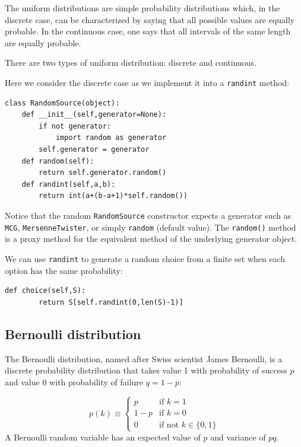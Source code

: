 \documentclass[justified,sixbynine]{tufte-book}
\def\ft{\small\tt}
\theoremstyle{plain}%
\theoremstyle{definition}
\theoremstyle{remark}
\begin{document}
\begin{fullwidth}
The uniform distributions are simple probability distributions which, in the
discrete case, can be characterized by saying that all possible values are
equally probable. In the continuous case, one says that all intervals of the
same length are equally probable.

There are two types of uniform distribution: discrete and continuous.

Here we consider the discrete case as we implement it into a {\ft randint} method:


\begin{lstlisting}[caption={in file: {\ft nlib.py}}]
class RandomSource(object):
    def __init__(self,generator=None):
        if not generator:
            import random as generator
        self.generator = generator
    def random(self):
        return self.generator.random()
    def randint(self,a,b):
        return int(a+(b-a+1)*self.random())
\end{lstlisting}

Notice that the random {\ft RandomSource} constructor expects a generator such as {\ft MCG}, {\ft MersenneTwister}, or simply {\ft random} (default value). The {\ft random()} method is a proxy method for the equivalent method of the underlying generator object.

We can use {\ft randint} to generate a random choice from a finite set when each option has the same probability:

\begin{lstlisting}[caption={in file: {\ft nlib.py}}]
    def choice(self,S):
        return S[self.randint(0,len(S)-1)]
\end{lstlisting}

\goodbreak\subsection{Bernoulli distribution}

The Bernoulli distribution, named after Swiss scientist James Bernoulli, is
a discrete probability distribution that takes value 1 with
probability of success $p$ and value 0 with probability of failure $q=1-p$:

\begin{equation}
p(k) \equiv 
\begin{cases}
p & \text{if }k=1 \\
1-p & \text{if }k=0 \\
0 & \text{if not }k \in \{0,1\}
\end{cases}
\end{equation}
A Bernoulli random variable has an expected value of $p$ and variance of $pq$.


\end{fullwidth}
\end{document}
